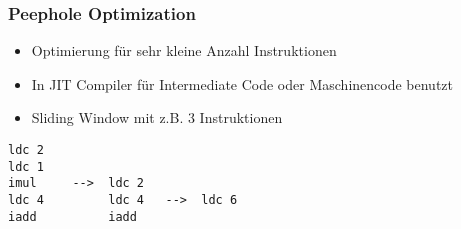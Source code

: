 \subsubsection{Peephole Optimization}
\begin{itemize}[topsep=0pt]
    \itemsep -0.2em
    \item Optimierung für sehr kleine Anzahl Instruktionen
    \item In JIT Compiler für Intermediate Code oder Maschinencode benutzt
    \item Sliding Window mit z.B. 3 Instruktionen
\end{itemize}

\begin{lstlisting}
ldc 2
ldc 1
imul     -->  ldc 2
ldc 4         ldc 4   -->  ldc 6
iadd          iadd
\end{lstlisting}